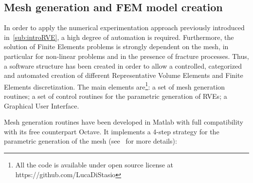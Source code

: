 \documentclass[a4paper]{jpconf}
\begin{document}
\subsection{Mesh generation and FEM model creation}
In order to apply the numerical experimentation approach previously introduced in~\ref{sub:introRVE}, a high degree of automation is required. Furthermore, the solution of Finite Elements problems is strongly dependent on the mesh, in particular for non-linear problems and in the presence of fracture processes. Thus, a software structure has been created in order to allow a controlled, categorized and automated creation of different Representative Volume Elements and Finite Elements discretization. The main elements are\footnote[1]{All the code is available under open source license at https://github.com/LucaDiStasio}: a set of mesh generation routines; a set of control routines for the parametric generation of RVEs; a Graphical User Interface.\par
Mesh generation routines have been developed in Matlab with full compatibility with its free counterpart Octave. It implements a 4-step strategy for the parametric generation of the mesh (see~\cite{ThompsonWarsiMastin:1985,ThompsonSoniWeatherill:1998} for more details):
\end{document}
